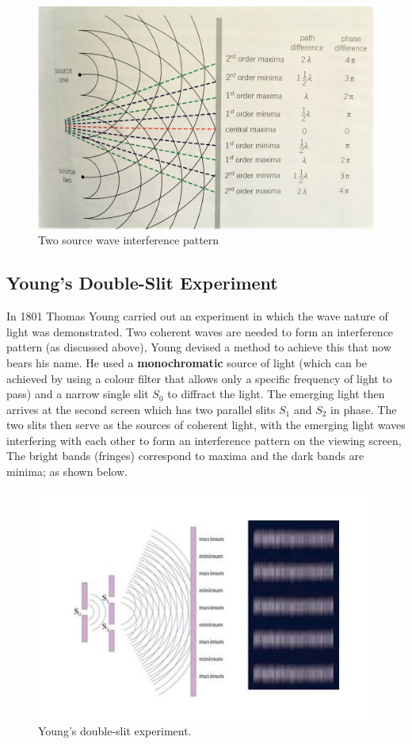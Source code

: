 \begin{figure}[h!]
    \centering
    \includegraphics[scale=0.1]{notes/images/Interference.JPG}
    \caption{Two source wave interference pattern}
\end{figure}
\FloatBarrier

\subsection{Young's Double-Slit Experiment}

In 1801 Thomas Young carried out an experiment in which the wave nature of light was demonstrated. Two coherent waves are needed to form an interference pattern (as discussed above), Young devised a method to achieve this that now bears his name. He used a \textbf{monochromatic} source of light (which can be achieved by using a colour filter that allows only a specific frequency of light to pass) and a narrow single slit $S_0$ to diffract the light. The emerging light then arrives at the second screen which has two parallel slits $S_1$ and $S_2$ in phase. The two slits then serve as the sources of coherent light, with the emerging light waves interfering with each other to form an interference pattern on the viewing screen, The bright bands (fringes) correspond to maxima and the dark bands are minima; as shown below.
\begin{figure}[h!]
    \centering
    \includegraphics[scale=0.7]{notes/images/Interference-Single-Source-1.JPG}
    \caption{Young's double-slit experiment.}
\end{figure}
\FloatBarrier

